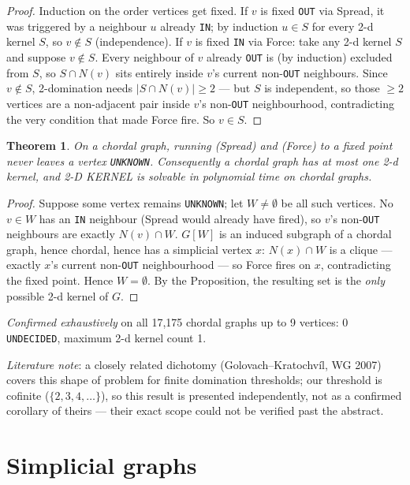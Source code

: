 \documentclass[11pt]{article}
\theoremstyle{plain}
\newtheorem{theorem}{Theorem}
\theoremstyle{definition}
\theoremstyle{remark}
\begin{document}
\begin{proof}
Induction on the order vertices get fixed. If $v$ is fixed \texttt{OUT} via Spread,
it was triggered by a neighbour $u$ already \texttt{IN}; by induction $u\in S$ for
every 2-d kernel $S$, so $v\notin S$ (independence). If $v$ is fixed \texttt{IN} via
Force: take any 2-d kernel $S$ and suppose $v\notin S$. Every neighbour of $v$ already
\texttt{OUT} is (by induction) excluded from $S$, so $S\cap N(v)$ sits entirely
inside $v$'s current non-\texttt{OUT} neighbours. Since $v\notin S$, 2-domination
needs $|S\cap N(v)|\ge2$ — but $S$ is independent, so those $\ge2$ vertices are a
non-adjacent pair inside $v$'s non-\texttt{OUT} neighbourhood, contradicting the very
condition that made Force fire. So $v\in S$.
\end{proof}

\begin{theorem}
On a chordal graph, running (Spread) and (Force) to a fixed point never leaves a
vertex \texttt{UNKNOWN}. Consequently a chordal graph has at most one 2-d kernel, and
2-D KERNEL is solvable in polynomial time on chordal graphs.
\end{theorem}

\begin{proof}
Suppose some vertex remains \texttt{UNKNOWN}; let $W\ne\emptyset$ be all such
vertices. No $v\in W$ has an \texttt{IN} neighbour (Spread would already have fired),
so $v$'s non-\texttt{OUT} neighbours are exactly $N(v)\cap W$. $G[W]$ is an induced
subgraph of a chordal graph, hence chordal, hence has a simplicial vertex $x$: $N(x)
\cap W$ is a clique — exactly $x$'s current non-\texttt{OUT} neighbourhood — so Force
fires on $x$, contradicting the fixed point. Hence $W=\emptyset$. By the Proposition,
the resulting set is the \emph{only} possible 2-d kernel of $G$.
\end{proof}

\emph{Confirmed exhaustively} on all 17{,}175 chordal graphs up to 9 vertices: 0
\texttt{UNDECIDED}, maximum 2-d kernel count 1.

\emph{Literature note}: a closely related dichotomy (Golovach--Kratochv\'il, WG 2007)
covers this shape of problem for finite domination thresholds; our threshold is
cofinite ($\{2,3,4,\dots\}$), so this result is presented independently, not as a
confirmed corollary of theirs — their exact scope could not be verified past the
abstract.

\section{Simplicial graphs}
\end{document}
